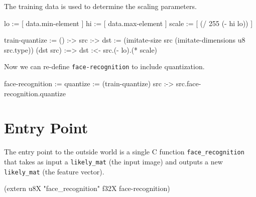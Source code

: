\documentclass{article}
\newenvironment{likely}
{ \verbatim }
{ \endverbatim }
\begin{document}
The training data is used to determine the scaling parameters.

\begin{likely}
lo    := [ data.min-element  ]
hi    := [ data.max-element  ]
scale := [ (/ 255 (- hi lo)) ]

train-quantize :=
  () :->
  {
    src :->
    {
      dst := (imitate-size src (imitate-dimensions u8 src.type))
      (dst src) :=>
        dst :<- src.(- lo).(* scale)
    }
  }
\end{likely}

Now we can re-define \texttt{face-recognition} to include quantization.

\begin{likely}
face-recognition :=
{
  quantize := (train-quantize)
  src :->
    src.face-recognition.quantize
}
\end{likely}

\section{Entry Point}
The entry point to the outside world is a single C function \texttt{face\_recognition} that takes as input a \texttt{likely\_mat} (the input image) and outputs a new \texttt{likely\_mat} (the feature vector).

\begin{likely}
(extern u8X "face_recognition" f32X face-recognition)
\end{likely}
\end{document}
